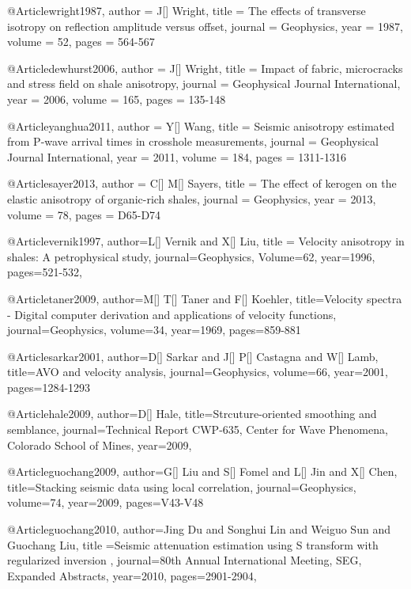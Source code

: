 @Article{wright1987,
  author = 	 {J[] Wright},
  title = 	 {The effects of transverse isotropy on reflection amplitude versus offset},
  journal = 	 {Geophysics},
  year = 	 1987,
  volume =	 52,
  pages =	 {564-567}
}

@Article{dewhurst2006,
  author = 	 {J[] Wright},
  title = 	 {Impact of fabric, microcracks and stress field on shale anisotropy},
  journal = 	 {Geophysical Journal International},
  year = 	 2006,
  volume =	 165,
  pages =	 {135-148}
}

@Article{yanghua2011,
  author = 	 {Y[] Wang},
  title = 	 {Seismic anisotropy estimated from P-wave arrival times in crosshole measurements},
  journal = 	 {Geophysical Journal International},
  year = 	 2011,
  volume =	 184,
  pages =	 {1311-1316}
}

@Article{sayer2013,
  author = 	 {C[] M[] Sayers},
  title = 	 {The effect of kerogen on the elastic anisotropy of
organic-rich shales},
  journal = 	 {Geophysics},
  year = 	 2013,
  volume =	 78,
  pages =	 {D65-D74}
}

@Article{vernik1997,
  author={L[] Vernik and X[] Liu},
  title = {Velocity anisotropy in shales: A petrophysical study},
  journal={Geophysics},
  Volume=62,
  year=1996,
  pages={521-532},
}


@Article{taner2009,
author={M[] T[] Taner and F[] Koehler},
title={Velocity spectra - Digital computer derivation and applications of velocity functions},
journal={Geophysics},
volume=34,
year=1969,
pages={859-881}
}

@Article{sarkar2001,
author={D[] Sarkar and J[] P[] Castagna and W[] Lamb},
title={AVO and velocity analysis},
journal={Geophysics},
volume=66,
year=2001,
pages={1284-1293}
}

@Article{hale2009,
author={D[] Hale},
title={Strcuture-oriented smoothing and semblance},
journal={Technical Report CWP-635, Center for Wave Phenomena, Colorado School of Mines},
year=2009,
}

@Article{guochang2009,
author={G[] Liu and S[] Fomel and L[] Jin and X[] Chen},
title={Stacking seismic data using local correlation},
journal={Geophysics},
volume=74,
year=2009,
pages={V43-V48}
}

@Article{guochang2010,
  author={Jing Du and Songhui Lin and Weiguo Sun and Guochang Liu},
  title ={Seismic attenuation estimation using S transform with regularized inversion
},
  journal={80th Annual International Meeting, SEG, Expanded Abstracts},
  year=2010,
  pages={2901-2904},
}

